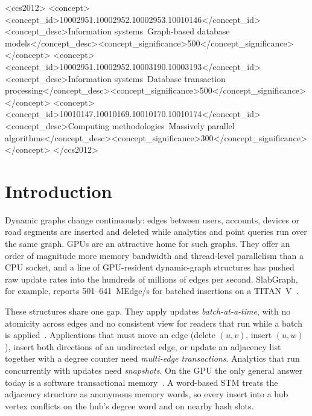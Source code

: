 \documentclass[sigconf,nonacm]{acmart}
\begin{document}
\begin{CCSXML}
<ccs2012>
<concept><concept_id>10002951.10002952.10002953.10010146</concept_id>
<concept_desc>Information systems~Graph-based database models</concept_desc><concept_significance>500</concept_significance></concept>
<concept><concept_id>10002951.10002952.10003190.10003193</concept_id>
<concept_desc>Information systems~Database transaction processing</concept_desc><concept_significance>500</concept_significance></concept>
<concept><concept_id>10010147.10010169.10010170.10010174</concept_id>
<concept_desc>Computing methodologies~Massively parallel algorithms</concept_desc><concept_significance>300</concept_significance></concept>
</ccs2012>
\end{CCSXML}


\maketitle

\section{Introduction}

Dynamic graphs change continuously: edges between users, accounts, devices or road segments are inserted and deleted
while analytics and point queries run over the same graph. GPUs are an attractive home for such graphs. They offer an
order of magnitude more memory bandwidth and thread-level parallelism than a CPU socket, and a line of GPU-resident
dynamic-graph structures has pushed raw update rates into the hundreds of millions of edges per second. SlabGraph, for
example, reports 501--641~MEdge/s for batched insertions on a TITAN~V~\cite{slabgraph}.

These structures share one gap. They apply updates \emph{batch-at-a-time}, with no atomicity across edges and no
consistent view for readers that run while a batch is applied~\cite{gpma,lpma,hornet,faimgraph,slabgraph,meerkat,survey25}.
Applications that must move an edge (delete $(u,v)$, insert $(u,w)$), insert both directions of an undirected edge, or
update an adjacency list together with a degree counter need \emph{multi-edge transactions}. Analytics that run
concurrently with updates need \emph{snapshots}. On the GPU the only general answer today is a software transactional
memory~\cite{gpustm,prstm,csmv}. A word-based STM treats the adjacency structure as anonymous memory words, so every
insert into a hub vertex conflicts on the hub's degree word and on nearby hash slots.
\end{document}
